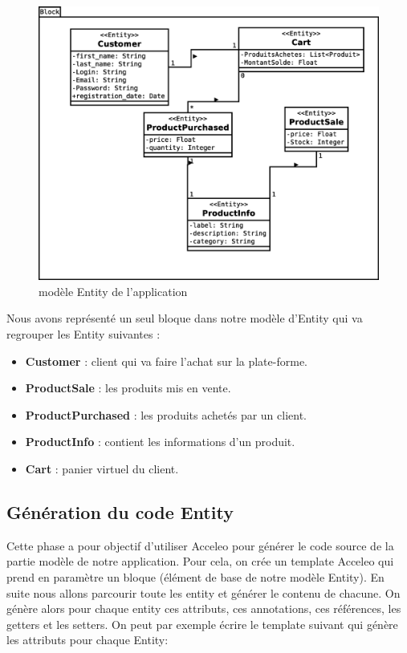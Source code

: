 \begin{figure}[H]
  \centering
  \includegraphics[scale=.4]{img/Entitymodel.eps}
  \caption{modèle Entity de l'application}
  \label{fig:entMod}
\end{figure}

Nous avons représenté un seul bloque dans notre modèle d'Entity qui va regrouper les Entity suivantes :  

\begin{itemize}
  \item[\textbullet] \textbf{Customer} :  client qui va faire l'achat sur la plate-forme.
  \item[\textbullet] \textbf{ProductSale} : les produits mis en vente.
  \item[\textbullet] \textbf{ProductPurchased} : les produits achetés par un client.
  \item[\textbullet] \textbf{ProductInfo} : contient les informations d'un produit.
  \item[\textbullet] \textbf{Cart} : panier virtuel du client.
\end{itemize}

\subsection{Génération du code Entity}
Cette phase a pour objectif d'utiliser Acceleo pour générer le code source de la partie modèle de notre application.
Pour cela, on crée un template Acceleo qui prend en paramètre un bloque (élément de base de notre modèle Entity). En suite nous allons parcourir toute les entity et générer le contenu de chacune. On génère alors pour chaque entity ces attributs, ces annotations, ces références, les getters et les setters. On peut par exemple écrire le template suivant qui génère les attributs pour chaque Entity: \\


